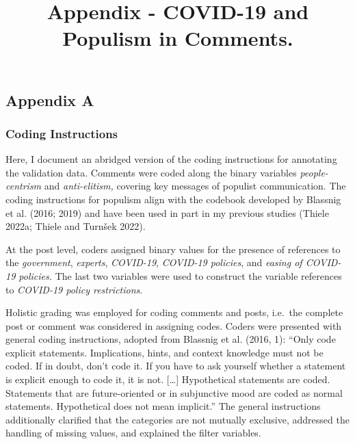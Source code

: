 \documentclass[
]{ccr}
\title{Appendix - COVID-19 and Populism in Comments.}
\begin{document}
\maketitle



\ifdefined\Shaded\renewenvironment{Shaded}{\begin{tcolorbox}[interior hidden, boxrule=0pt, borderline west={3pt}{0pt}{shadecolor}, enhanced, breakable, sharp corners, frame hidden]}{\end{tcolorbox}}\fi

\newpage
\appendix
\renewcommand{\thefigure}{A\arabic{figure}}
\renewcommand{\thetable}{A\arabic{table}}
\setcounter{figure}{0}
\setcounter{table}{0}
\setcounter{page}{1}

\hypertarget{appendix-a}{%
\subsection{Appendix A}\label{appendix-a}}

\hypertarget{coding-instructions}{%
\subsubsection{Coding Instructions}\label{coding-instructions}}

Here, I document an abridged version of the coding instructions for
annotating the validation data. Comments were coded along the binary
variables \emph{people-centrism} and \emph{anti-elitism,} covering key
messages of populist communication. The coding instructions for populism
align with the codebook developed by Blassnig et al. (2016; 2019) and
have been used in part in my previous studies (Thiele 2022a; Thiele and
Turnšek 2022).

At the post level, coders assigned binary values for the presence of
references to the \emph{government}, \emph{experts}, \emph{COVID-19},
\emph{COVID-19 policies}, and \emph{easing of COVID-19 policies.} The
last two variables were used to construct the variable references to
\emph{COVID-19 policy restrictions}.

Holistic grading was employed for coding comments and posts, i.e.~the
complete post or comment was considered in assigning codes. Coders were
presented with general coding instructions, adopted from Blassnig et al.
(2016, 1): ``Only code explicit statements. Implications, hints, and
context knowledge must not be coded. If in doubt, don't code it. If you
have to ask yourself whether a statement is explicit enough to code it,
it is not. {[}\ldots{]} Hypothetical statements are coded. Statements
that are future-oriented or in subjunctive mood are coded as normal
statements. Hypothetical does not mean implicit.'' The general
instructions additionally clarified that the categories are not mutually
exclusive, addressed the handling of missing values, and explained the
filter variables.
\end{document}
